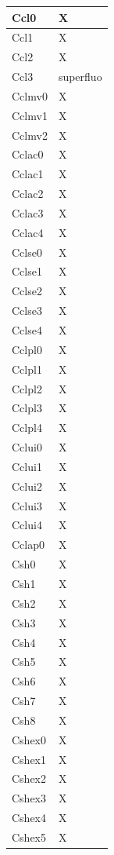 \begin{footnotesize}
\begin{longtable}{|p{}|p{}|}
 Ccl0 &X \\ \hline
 Ccl1 &X  \\ \hline
 Ccl2 &X  \\ \hline
 Ccl3 &superfluo  \\ \hline
 Cclmv0 &X  \\ \hline
 Cclmv1 &X  \\ \hline
 Cclmv2 &X  \\ \hline
 Cclac0 &X  \\ \hline
 Cclac1 &X  \\ \hline
 Cclac2 &X  \\ \hline
 Cclac3 &X  \\ \hline
 Cclac4 &X  \\ \hline
 Cclse0 &X  \\ \hline
 Cclse1 &X  \\ \hline
 Cclse2 &X  \\ \hline
 Cclse3 &X  \\ \hline
 Cclse4 &X  \\ \hline
 Cclpl0 &X  \\ \hline
 Cclpl1 &X  \\ \hline
 Cclpl2 &X  \\ \hline
 Cclpl3 &X  \\ \hline
 Cclpl4 &X  \\ \hline
 Cclui0 &X  \\ \hline
 Cclui1 &X  \\ \hline
 Cclui2 &X  \\ \hline
 Cclui3 &X  \\ \hline
 Cclui4 &X  \\ \hline
 Cclap0 &X  \\ \hline
 Csh0 &X  \\ \hline
 Csh1 &X  \\ \hline
 Csh2 &X  \\ \hline
 Csh3 &X  \\ \hline
 Csh4 &X  \\ \hline
 Csh5 &X  \\ \hline
 Csh6 &X  \\ \hline
 Csh7 &X  \\ \hline
 Csh8 &X  \\ \hline
 Cshex0 &X  \\ \hline
 Cshex1 &X  \\ \hline
 Cshex2 &X  \\ \hline
 Cshex3 &X  \\ \hline
 Cshex4 &X  \\ \hline
 Cshex5 &X  \\ \hline

\end{longtable}
\end{footnotesize}

